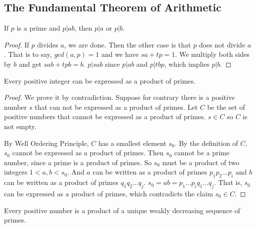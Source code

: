 \documentclass[11pt]{article}
\begin{document}
\subsection{The Fundamental Theorem of Arithmetic}

\begin{lemma}
If $p$ is a prime and $p|ab$, then $p|a$ or $p|b$.
\end{lemma}

\begin{proof}
If $p$ divides $a$, we are done. Then the other case is that $p$ does not divide $a$. That
is to say, $gcd(a,p)=1$ and we have $sa+tp=1$. We multiply both sides by $b$ and get
$sab+tpb=b$. $p|sab$ since $p|ab$ and $p|tbp$, which implies $p|b$.
\end{proof}

\begin{lemma} \label{lemma:9}
Every positive integer can be expressed as a product of primes.
\end{lemma}

\begin{proof}
We prove it by contradiction. Suppose for contrary there is a positive number $s$ that can
not be expressed as a product of primes. Let $C$ be the set of positive numbers that cannot
be expressed as a product of primes. $s \in C$ so $C$ is not empty.

By Well Ordering Principle, $C$ has a smallest element $s_0$. By the definition of $C$,
$s_0$ cannot be expressed as a product of primes. Then $s_0$ cannot be a prime number, since
a prime is a product of primes. So $s_0$ must be a product of two integers $1 < a,b < s_0$.
And $a$ can be written as a product of primes $p_1p_2 \dots p_i$ and $b$ can be written as a
product of primes $q_1q_2 \dots q_j$. $s_0 = ab = p_1 \dots p_iq_1 \dots q_j$. That is,
$s_0$ can be expressed as a product of primes, which contradicts the claim $s_0 \in C$.
\end{proof}

\begin{theorem}
Every positive number is a product of a unique weakly decreasing sequence of primes.
\end{theorem}
\end{document}
